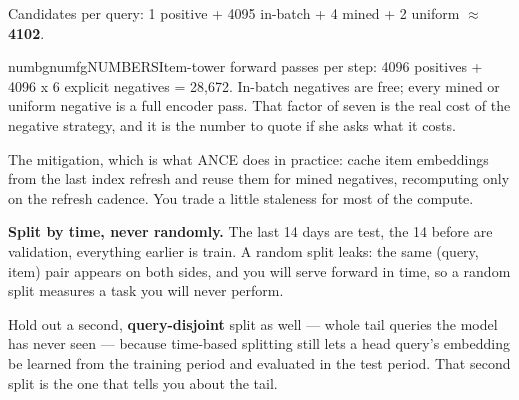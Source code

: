 \documentclass[10pt,twoside]{book}
\makeatletter
\newcommand{\csubsection}[1]{\par\vspace{9pt}\noindent{\sffamily\normalsize\bfseries\color{accent}\raggedright #1\par}\vspace{2pt}}
\newenvironment{calloutnum}{\begin{co@box}{numbg}{numfg}{NUMBERS}}{\end{co@box}}
\makeatother
\begin{document}
Candidates per query: 1 positive + 4095 in-batch + 4 mined + 2 uniform $\approx$ \textbf{4102}.\par
\begin{calloutnum}Item-tower forward passes per step: 4096 positives + 4096 x 6 explicit negatives = 28,672. In-batch negatives are free; every mined or uniform negative is a full encoder pass. That factor of seven is the real cost of the negative strategy, and it is the number to quote if she asks what it costs.\end{calloutnum}
The mitigation, which is what ANCE does in practice: cache item embeddings from the last index refresh and reuse them for mined negatives, recomputing only on the refresh cadence. You trade a little staleness for most of the compute.\par
\csubsection{The negative sources, side by side}
\par{}\par\medskip
\csubsection{Splits}
\textbf{Split by time, never randomly.} The last 14 days are test, the 14 before are validation, everything earlier is train. A random split leaks: the same (query, item) pair appears on both sides, and you will serve forward in time, so a random split measures a task you will never perform.\par
Hold out a second, \textbf{query-disjoint} split as well --- whole tail queries the model has never seen --- because time-based splitting still lets a head query's embedding be learned from the training period and evaluated in the test period. That second split is the one that tells you about the tail.\par
\end{document}
